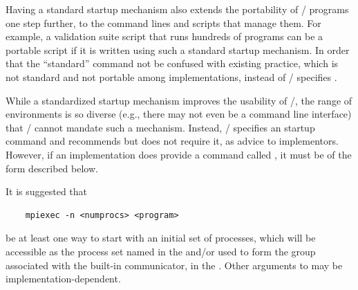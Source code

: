 Having a standard startup mechanism also extends the portability of
\MPI/ programs one step further, to the command lines
and scripts that manage them.  For example, a validation suite script
that runs hundreds of programs can be a portable script if it is
written using such a standard startup mechanism.
In order that the ``standard'' command not be confused with existing
practice, which is not standard and not portable among implementations,
instead of  \MPI/ specifies .

While a standardized startup mechanism improves the usability of \MPI/,
the range of environments is so diverse (e.g., there may not even be a
command line interface) that \MPI/ cannot mandate such a
mechanism. Instead, \MPI/ specifies an  startup command and
recommends but does not require it, as advice to implementors.
However, if an implementation does provide a command called
, it must be of the form described below.



It is suggested that
\begin{verbatim}
    mpiexec -n <numprocs> <program>
\end{verbatim}
be at least one way to start  with an initial
set of  processes, which will be accessible as the process set named  in the \spm{} and/or used to form the group associated with the built-in communicator,  in the \wpm{}.
Other arguments to  may be implementation-dependent.


